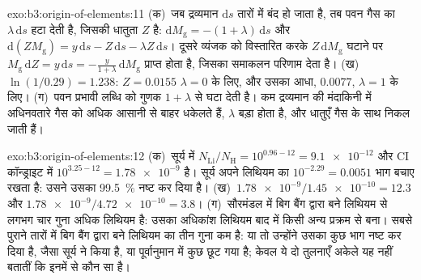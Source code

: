 \begin{solution}{exo:b3:origin-of-elements:11}
(क)~जब द्रव्यमान $\mathrm{d}s$ तारों में बंद हो जाता है, तब पवन
गैस का $\lambda\,\mathrm{d}s$ हटा देती है, जिसकी धातुता $Z$ है:
$\mathrm{d}M_\mathrm{g} = -(1 + \lambda)\,\mathrm{d}s$ और
$\mathrm{d}(ZM_\mathrm{g}) = y\,\mathrm{d}s - Z\,\mathrm{d}s -
\lambda Z\,\mathrm{d}s$। दूसरे व्यंजक को विस्तारित करके
$Z\,\mathrm{d}M_\mathrm{g}$ घटाने पर $M_\mathrm{g}\,\mathrm{d}Z =
y\,\mathrm{d}s = -\frac{y}{1 + \lambda}\,\mathrm{d}M_\mathrm{g}$ प्राप्त होता है,
जिसका समाकलन परिणाम देता है। (ख)~$\ln(1/0.29) = 1.238$: $Z = 0.0155$
$\lambda = 0$ के लिए, और उसका आधा, $0.0077$, $\lambda = 1$ के लिए। (ग)~पवन
प्रभावी लब्धि को गुणक $1 + \lambda$ से घटा देती है। कम द्रव्यमान की
मंदाकिनी में अधिनवतारे गैस को अधिक आसानी से बाहर धकेलते हैं, $\lambda$ बड़ा होता है,
और धातुएँ गैस के साथ निकल जाती हैं।
\end{solution}

\begin{solution}{exo:b3:origin-of-elements:12}
(क)~सूर्य में $N_\mathrm{Li}/N_\mathrm{H} = 10^{0.96 - 12} = \num{9.1e-12}$
और CI कॉन्ड्राइट में $10^{3.25 - 12} = \num{1.78e-9}$ है। सूर्य
अपने लिथियम का $10^{-2.29} = \num{0.0051}$ भाग बचाए रखता है: उसने
उसका \qty{99.5}{\percent} नष्ट कर दिया है। (ख)~$\num{1.78e-9}/\num{1.45e-10} = 12.3$ और
$\num{1.78e-9}/\num{4.72e-10} = 3.8$। (ग)~सौरमंडल में बिग बैंग द्वारा बने लिथियम से लगभग चार गुना अधिक लिथियम है:
उसका अधिकांश लिथियम
बाद में किसी अन्य प्रक्रम से बना। सबसे पुराने तारों में बिग बैंग द्वारा बने
लिथियम का तीन गुना कम है: या तो उन्होंने उसका कुछ भाग नष्ट कर दिया है, जैसा
सूर्य ने किया है, या पूर्वानुमान में कुछ छूट गया है; केवल ये दो तुलनाएँ
अकेले यह नहीं बतातीं कि इनमें से कौन सा है।
\end{solution}

